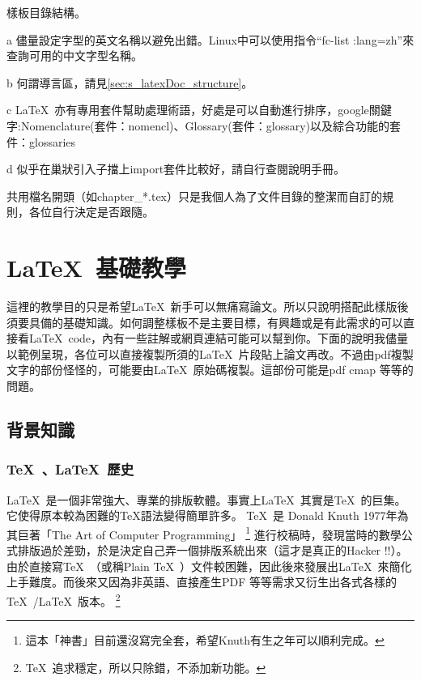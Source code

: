 \documentclass[class=NCU_thesis, crop=false, float=true]{standalone}
\begin{document}
\begin{table}
\begin{threeparttable}
    \caption{樣板目錄結構。}
    \label{tab:template_structure}
    
    \begin{tablenotes}
        \footnotesize
        \item[a]{儘量設定字型的英文名稱以避免出錯。Linux中可以使用指令``fc-list :lang=zh''來查詢可用的中文字型名稱。}
        \item[b] 何謂導言區，請見\cref{sec:s_latexDoc_structure}。
        \item[c] \LaTeX\ 亦有專用套件幫助處理術語，好處是可以自動進行排序，google關鍵字:Nomenclature(套件：nomencl)、Glossary(套件：glossary)以及綜合功能的套件：glossaries
        \item[d] 似乎在巢狀引入子擋上import套件比較好，請自行查閱說明手冊。
    \end{tablenotes}
    \end{threeparttable}
\end{table}
共用檔名開頭（如chapter\_*.tex）只是我個人為了文件目錄的整潔而自訂的規則，各位自行決定是否跟隨。

\chapter{\LaTeX\ 基礎教學}
\label{sec:c_basicLatex}
這裡的教學目的只是希望\LaTeX\ 新手可以無痛寫論文。所以只說明搭配此樣版後須要具備的基礎知識。如何調整樣板不是主要目標，有興趣或是有此需求的可以直接看\LaTeX\  code，內有一些註解或網頁連結可能可以幫到你。下面的說明我儘量以範例呈現，各位可以直接複製所須的\LaTeX\ 片段貼上論文再改。不過由pdf複製文字的部份怪怪的，可能要由\LaTeX\  原始碼複製。這部份可能是pdf cmap 等等的問題。

\section{背景知識}

\subsection{\TeX\ 、\LaTeX\ 歷史}
\LaTeX\  是一個非常強大、專業的排版軟體。事實上\LaTeX\ 其實是\TeX\ 的巨集。它使得原本較為困難的TeX語法變得簡單許多。
\TeX\  是 Donald Knuth 1977年為其巨著「The Art of Computer Programming」
\footnote{這本「神書」目前還沒寫完全套，希望Knuth有生之年可以順利完成。}
進行校稿時，發現當時的數學公式排版過於差勁，於是決定自己弄一個排版系統出來（這才是真正的Hacker !!）。由於直接寫\TeX\ （或稱Plain \TeX\ ）文件較困難，因此後來發展出\LaTeX\ 來簡化上手難度。而後來又因為非英語、直接產生PDF 等等需求又衍生出各式各樣的\TeX\ /\LaTeX\ 版本。
\footnote{\TeX\  追求穩定，所以只除錯，不添加新功能。}
\end{document}

